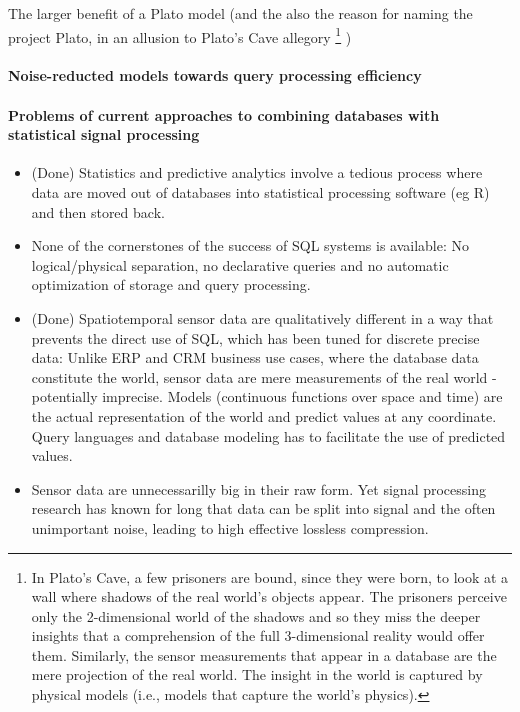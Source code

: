 {%

The larger benefit of a Plato model (and the also the reason for naming the project Plato, in an allusion to Plato's Cave allegory%
\footnote{In Plato's Cave, a few prisoners are bound, since they were born, to look at a wall where shadows of the real world's objects appear. The prisoners perceive only the 2-dimensional world of the shadows and so they miss the deeper insights that a comprehension of the full 3-dimensional reality would offer them. Similarly, the sensor measurements that appear in a database are the mere projection of the real world. The insight in the world is captured by physical models (i.e., models that capture the world's physics). 
}
)

\paragraph{Noise-reducted models towards query processing efficiency}





\paragraph{Problems of current approaches to combining databases with statistical signal processing}
\begin{itemize}
\item (Done) Statistics and predictive analytics involve a tedious process where data are moved out of databases into statistical processing software (eg R) and then stored back.
%
\item None of the cornerstones of the success of SQL systems is available: No logical/physical separation, no declarative queries and no automatic optimization of storage and query processing.
%
\item (Done) Spatiotemporal sensor data are qualitatively different in a way that prevents the direct use of SQL, which has been tuned for discrete precise data: Unlike ERP and CRM business use cases, where the database data constitute the world, sensor data are mere measurements of the real world - potentially imprecise. Models (continuous functions over space and time) are the actual representation of the world and predict values at any coordinate. Query languages and database modeling has to facilitate the use of predicted values.
%
\item Sensor data are unnecessarilly big in their raw form. Yet signal processing research has known for long that data can be split into signal and the often unimportant noise, leading to high effective lossless compression. 
%
\end{itemize}

}
